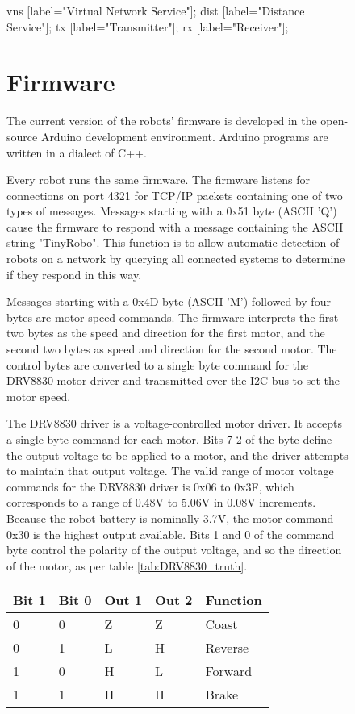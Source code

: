 \begin{figure}
{{		
	vns [label="Virtual Network Service"];
	dist [label="Distance Service"];
	tx [label="Transmitter"];
	rx [label="Receiver"];
	\caption{Data flow in the virtual network. The virtual network service can take the distance between the transmitting robot and the receiving robot into account when determining if the message is delivered.}

\section {Firmware}

The current version of the robots' firmware is developed in the open-source Arduino development environment.
Arduino programs are written in a dialect of C++. 

Every robot runs the same firmware. 
The firmware listens for connections on port 4321 for TCP/IP packets containing one of two types of messages. 
Messages starting with a 0x51 byte (ASCII 'Q') cause the firmware to respond with a message containing the ASCII string "TinyRobo". 
This function is to allow automatic detection of robots on a network by querying all connected systems to determine if they respond in this way. 

Messages starting with a 0x4D byte (ASCII 'M') followed by four bytes are motor speed commands.
The firmware interprets the first two bytes as the speed and direction for the first motor, and the second two bytes as speed and direction for the second motor.
The control bytes are converted to a single byte command for the DRV8830 motor driver and transmitted over the I2C bus to set the motor speed.
 
The DRV8830 driver is a voltage-controlled motor driver. 
It accepts a single-byte command for each motor. 
Bits 7-2 of the byte define the output voltage to be applied to a motor, and the driver attempts to maintain that output voltage.
The valid range of motor voltage commands for the DRV8830 driver is 0x06 to 0x3F, which corresponds to a range of 0.48V to 5.06V in 0.08V increments. 
Because the robot battery is nominally 3.7V, the motor command 0x30 is the highest output available. 
Bits 1 and 0 of the command byte control the polarity of the output voltage, and so the direction of the motor, as per table \ref{tab:DRV8830_truth}.

\begin{table}
	\begin{tabular}{l l l l l}
	Bit 1 & Bit 0 & Out 1 & Out 2 & Function\\
	\hline
	0 & 0 & Z & Z & Coast\\
	0 & 1 & L & H & Reverse\\
	1 & 0 & H & L & Forward\\
	1 & 1 & H & H & Brake\\				
	\end{tabular}
	

\end{table}}}
\end{figure}
